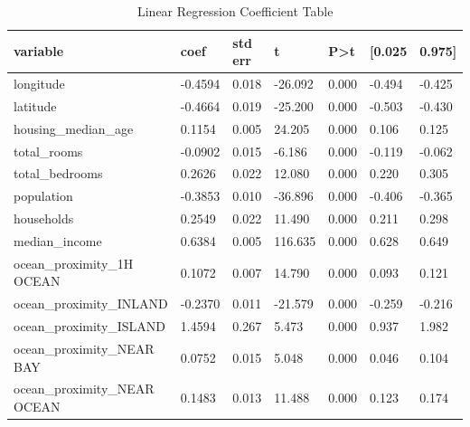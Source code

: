 \documentclass[11pt]{article}
\begin{document}
\appendix
\begin{table}[h]
        \begin{tabular}{|l|l|l|l|l|l|l|} 
        \hline
        \textbf{variable} & \textbf{coef} & \textbf{std err} & \textbf{t} & \textbf{P\textgreater{}\textbar{}t\textbar{}} & \textbf{[0.025} & \textbf{0.975]} \\ 
        \hline
        longitude & -0.4594 & 0.018 & -26.092 & 0.000 & -0.494 & -0.425 \\ 
        \hline
        latitude & -0.4664 & 0.019 & -25.200 & 0.000 & -0.503 & -0.430 \\ 
        \hline
        housing\_median\_age & 0.1154 & 0.005 & 24.205 & 0.000 & 0.106 & 0.125 \\ 
        \hline
        total\_rooms & -0.0902 & 0.015 & -6.186 & 0.000 & -0.119 & -0.062 \\ 
        \hline
        total\_bedrooms & 0.2626 & 0.022 & 12.080 & 0.000 & 0.220 & 0.305 \\ 
        \hline
        population & -0.3853 & 0.010 & -36.896 & 0.000 & -0.406 & -0.365 \\ 
        \hline
        households & 0.2549 & 0.022 & 11.490 & 0.000 & 0.211 & 0.298 \\ 
        \hline
        median\_income & 0.6384 & 0.005 & 116.635 & 0.000 & 0.628 & 0.649 \\ 
        \hline
        ocean\_proximity\_1H OCEAN & 0.1072 & 0.007 & 14.790 & 0.000 & 0.093 & 0.121 \\ 
        \hline
        ocean\_proximity\_INLAND & -0.2370 & 0.011 & -21.579 & 0.000 & -0.259 & -0.216 \\ 
        \hline
        ocean\_proximity\_ISLAND & 1.4594 & 0.267 & 5.473 & 0.000 & 0.937 & 1.982 \\ 
        \hline
        ocean\_proximity\_NEAR BAY & 0.0752 & 0.015 & 5.048 & 0.000 & 0.046 & 0.104 \\ 
        \hline
        ocean\_proximity\_NEAR OCEAN & 0.1483 & 0.013 & 11.488 & 0.000 & 0.123 & 0.174 \\
        \hline
        \end{tabular}
\caption{Linear Regression Coefficient Table}
\label{tab:lin-reg-table}
\end{table}


\end{document}
